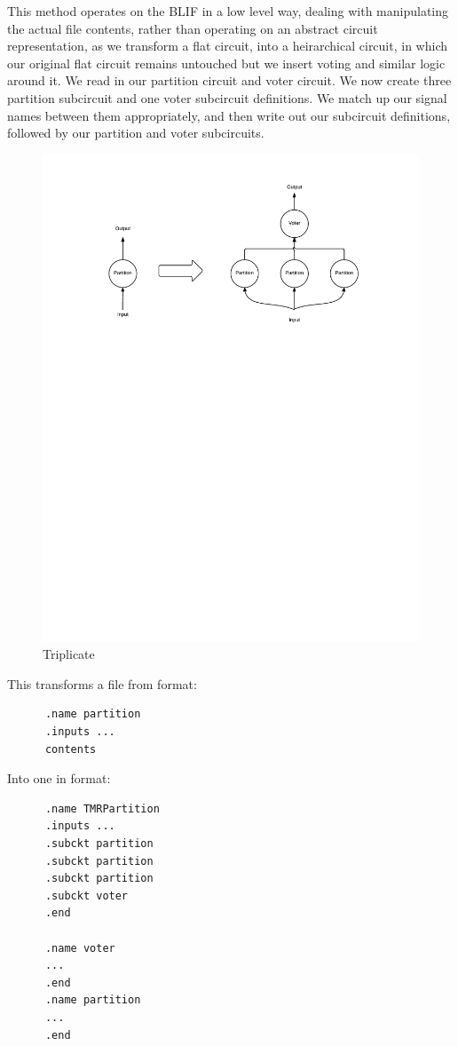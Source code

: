 \documentclass[12pt,final,oneside]{dwThesis} %
\begin{document}
   This method operates on the \ac{BLIF} in a low level way, dealing with manipulating the actual file contents, rather than operating on an abstract circuit representation, as we transform a flat circuit, into a heirarchical circuit, in which our original flat circuit remains untouched but we insert voting and similar logic around it.
   We read in our partition circuit and voter circuit. We now create three partition subcircuit and one voter subcircuit definitions. We match up our signal names between them appropriately, and then write out our subcircuit definitions, followed by our partition and voter subcircuits.

   \begin{figure}
      \begin{center}
         \includegraphics[width=\linewidth]{images/Triplicate.pdf}
         \caption{Triplicate}
         \label{imTriplicate}
      \end{center}
   \end{figure}
   This transforms a file from format:
   \begin{lstlisting}
      .name partition
      .inputs ...
      contents
   \end{lstlisting}
   Into one in format:
   \begin{lstlisting}
      .name TMRPartition
      .inputs ...
      .subckt partition
      .subckt partition
      .subckt partition
      .subckt voter
      .end

      .name voter
      ...
      .end
      .name partition
      ...
      .end
   \end{lstlisting}
\end{document}
